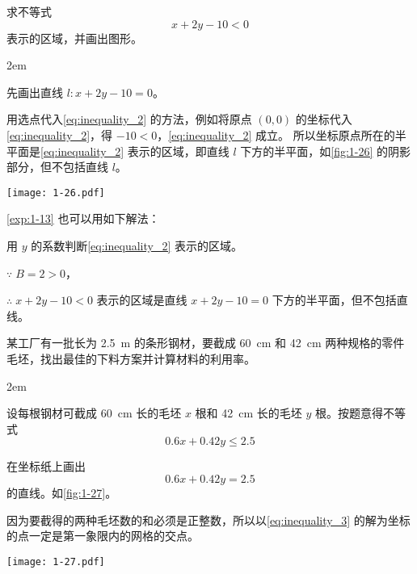 \begin{example}\label{exp:1-13}
  求不等式
  \begin{equation} 
    \label{eq:inequality_2}
    x+2y-10<0
  \end{equation}
  表示的区域，并画出图形。
\end{example}
\noindent
\begin{minipage}{0.45\linewidth}\parindent2em
\begin{solution}
  先画出直线 $l:x+2y-10=0$。

  用选点代入\cref{eq:inequality_2} 的方法，例如将原点 $(0,0)$ 的坐标代入\cref{eq:inequality_2}，得 $-10<0$，\cref{eq:inequality_2} 成立。
  所以坐标原点所在的半平面是\cref{eq:inequality_2} 表示的区域，即直线 $l$ 下方的半平面，如\cref{fig:1-26} 的阴影部分，但不包括直线 $l$。
\end{solution}
\end{minipage}\hfill
\begin{minipage}{0.5\linewidth}
\begin{figurehere}
  \texttt{[image: 1-26.pdf]}
  \caption{}\label{fig:1-26}
\end{figurehere}
\end{minipage}

\medskip
\cref{exp:1-13} 也可以用如下解法：

\begin{solution}
  用 $y$ 的系数判断\cref{eq:inequality_2} 表示的区域。

  $\because \; B=2>0$，
  
  $\therefore\; x+2y-10<0$ 表示的区域是直线 $x+2y-10=0$ 下方的半平面，但不包括直线。
\end{solution}

\begin{example}
  某工厂有一批长为 \qty{2.5}{m} 的条形钢材，要截成 \qty{60}{cm} 和 \qty{42}{cm} 两种规格的零件毛坯，找出最佳的下料方案并计算材料的利用率。
\end{example}
\noindent
\begin{minipage}{0.58\linewidth}\parindent2em
\begin{solution}
  设每根钢材可截成 \qty{60}{cm} 长的毛坯 $x$ 根和 \qty{42}{cm} 长的毛坯 $y$ 根。按题意得不等式
  \begin{equation}
    \label{eq:inequality_3}
    0.6x+0.42y\leqslant 2.5
  \end{equation}

  在坐标纸上画出
  \begin{equation}
    \label{eq:equality_3}
    0.6x+0.42y= 2.5
  \end{equation}
  的直线。如\cref{fig:1-27}。

  因为要截得的两种毛坯数的和必须是正整数，所以以\cref{eq:inequality_3} 的解为坐标的点一定是第一象限内的网格的交点。
\end{solution}
\end{minipage}\hfill
\begin{minipage}{0.37\linewidth}\centering
\begin{figurehere}
  \texttt{[image: 1-27.pdf]}
  \caption{}\label{fig:1-27}
\end{figurehere}
\end{minipage}

